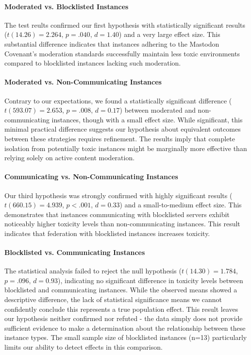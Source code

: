 \paragraph{Moderated vs. Blocklisted Instances}
The test reults confirmed our first hypothesis with statistically significant results ($t(14.26) = 2.264$, $p = .040$, $d = 1.40$) and a very large effect size. This substantial difference indicates that instances adhering to the Mastodon Covenant's moderation standards successfully maintain less toxic environments compared to blocklisted instances lacking such moderation.

\paragraph{Moderated vs. Non-Communicating Instances}
Contrary to our expectations, we found a statistically significant difference ($t(593.07) = 2.653$, $p = .008$, $d = 0.17$) between moderated and non-communicating instances, though with a small effect size. While significant, this minimal practical difference suggests our hypothesis about equivalent outcomes between these strategies requires refinement. The results imply that complete isolation from potentially toxic instances might be marginally more effective than relying solely on active content moderation.

\paragraph{Communicating vs. Non-Communicating Instances}
Our third hypothesis was strongly confirmed with highly significant results ($t(660.15) = 4.939$, $p < .001$, $d = 0.33$) and a small-to-medium effect size. This demonstrates that instances communicating with blocklisted servers exhibit noticeably higher toxicity levels than non-communicating instances. This result indicates that federation with blocklisted instances increases toxicity.

\paragraph{Blocklisted vs. Communicating Instances}
The statistical analysis failed to reject the null hypothesis ($t(14.30) = 1.784$, $p = .096$, $d=0.93$), indicating no significant difference in toxicity levels between blocklisted and communicating instances. While the observed means showed a descriptive difference, the lack of statistical significance means we cannot confidently conclude this represents a true population effect. This result leaves our hypothesis neither confirmed nor refuted - the data simply does not provide sufficient evidence to make a determination about the relationship between these instance types. The small sample size of blocklisted instances (n=13) particularly limits our ability to detect effects in this comparison.


